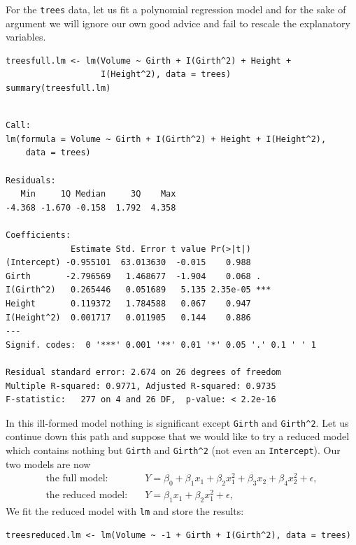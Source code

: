 \documentclass[captions=tableheading]{scrbook}
\begin{document}
\begin{example}

For the \texttt{trees} data, let us fit a polynomial regression model and for the sake of argument we will ignore our own good advice and fail to rescale the explanatory variables. 


\lstset{language=R}
\begin{lstlisting}
treesfull.lm <- lm(Volume ~ Girth + I(Girth^2) + Height + 
                   I(Height^2), data = trees)
summary(treesfull.lm)
\end{lstlisting}


\begin{verbatim}
 
Call:
lm(formula = Volume ~ Girth + I(Girth^2) + Height + I(Height^2), 
    data = trees)

Residuals:
   Min     1Q Median     3Q    Max 
-4.368 -1.670 -0.158  1.792  4.358 

Coefficients:
             Estimate Std. Error t value Pr(>|t|)    
(Intercept) -0.955101  63.013630  -0.015    0.988    
Girth       -2.796569   1.468677  -1.904    0.068 .  
I(Girth^2)   0.265446   0.051689   5.135 2.35e-05 ***
Height       0.119372   1.784588   0.067    0.947    
I(Height^2)  0.001717   0.011905   0.144    0.886    
---
Signif. codes:  0 '***' 0.001 '**' 0.01 '*' 0.05 '.' 0.1 ' ' 1 

Residual standard error: 2.674 on 26 degrees of freedom
Multiple R-squared: 0.9771,	Adjusted R-squared: 0.9735 
F-statistic:   277 on 4 and 26 DF,  p-value: < 2.2e-16
\end{verbatim}

In this ill-formed model nothing is significant except \texttt{Girth} and \texttt{Girth\textasciicircum{}2}. Let us continue down this path and suppose that we would like to try a reduced model which contains nothing but \texttt{Girth} and \texttt{Girth\textasciicircum{}2} (not even an \texttt{Intercept}). Our two models are now
\begin{align*} 
\mbox{the full model:} & \quad Y=\beta_{0}+\beta_{1}x_{1}+\beta_{2}x_{1}^{2}+\beta_{3}x_{2}+\beta_{4}x_{2}^{2}+\epsilon,\\
\mbox{the reduced model:} & \quad Y=\beta_{1}x_{1}+\beta_{2}x_{1}^{2}+\epsilon,
\end{align*}
We fit the reduced model with \texttt{lm} and store the results:


\lstset{language=R}
\begin{lstlisting}
treesreduced.lm <- lm(Volume ~ -1 + Girth + I(Girth^2), data = trees)
\end{lstlisting}


\end{example}
\end{document}
